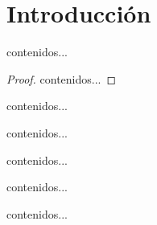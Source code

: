 {\justifying
\chapter{Introducción}
	\begin{theorem}{}{}
		contenidos...
	\end{theorem}
	\begin{proof}
		contenidos...
	\end{proof}
 	\begin{definition}{}{}
 		contenidos...
 	\end{definition}
 	\begin{corollary}{}{}
 		contenidos...
 	\end{corollary}
 	\begin{lemma}{}{}
 		contenidos...
 	\end{lemma}
 	\begin{example}{}{}
 		contenidos...
 	\end{example}
 	\begin{freebox}[Observación]
 		contenidos...
 	\end{freebox}
}